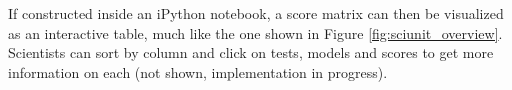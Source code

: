 \documentclass[9pt]{sig-alternate}
\begin{document}
If constructed inside an iPython notebook, a score matrix can then be visualized as an interactive table, much like the one shown in Figure \ref{fig:sciunit_overview}. Scientists can sort by column and click on tests, models and scores to get more information on each (not shown, implementation in progress).

 

\end{document}
